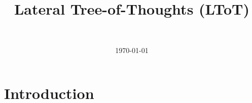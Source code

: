 \documentclass[onecolumn]{IEEEtran}
\title{Lateral Tree-of-Thoughts (LToT)}
\date{\today}
\author{
    \IEEEauthorblockN{Abhinav Madahar}\\
    \IEEEauthorblockA{
        Independent Computer Scientist\\
        Email: \href{mailto:abhinavmadahar@gmail.com}{abhinavmadahar@gmail.com}
    }
}
\begin{document}
\maketitle

\begin{abstract}
\end{abstract}

\section{Introduction}
\label{section:introduction}

\printbibliography
\end{document}
